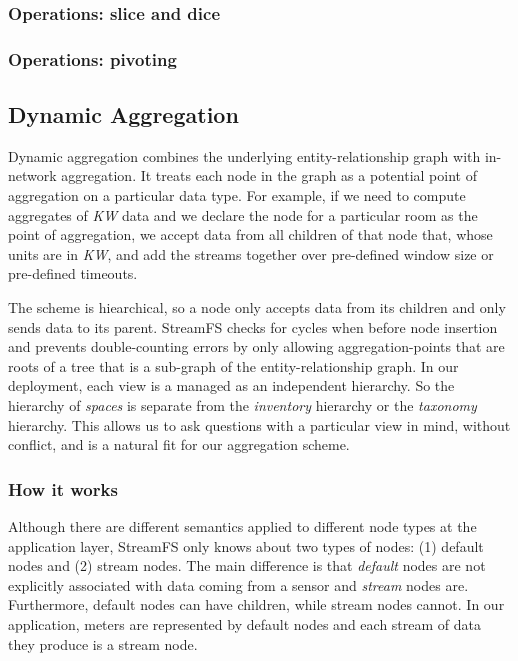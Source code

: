 \subsubsection{Operations: slice and dice}

\subsubsection{Operations: pivoting}
\subsection{Dynamic Aggregation}
\label{sec:dynagg}
Dynamic aggregation combines the underlying entity-relationship graph with in-network aggregation.  It treats
each node in the graph as a potential point of aggregation on a particular data type.  For example,
if we need to compute aggregates of \emph{KW} data and we declare the node for a particular room as
the point of aggregation, we accept data from all children of that node that, whose units are in \emph{KW},
and add the streams together over pre-defined window size or pre-defined timeouts.

The scheme is hiearchical, so a node only accepts data from its children and only sends data to its parent.
StreamFS checks for cycles when before node insertion and prevents double-counting errors by only allowing 
aggregation-points that are roots of a tree that is a sub-graph of the entity-relationship graph.  In our deployment,
each view is a managed as an independent hierarchy.  So the hierarchy of \emph{spaces} is separate from
the \emph{inventory} hierarchy or the \emph{taxonomy} hierarchy.  This allows us to ask questions with a particular
view in mind, without conflict, and is a natural fit for our aggregation scheme.

\subsubsection{How it works}
Although there are different semantics applied to different node types at the application layer, StreamFS only knows
about two types of nodes: (1) default nodes and (2) stream nodes.  The main difference is that \emph{default} nodes
are not explicitly associated with data coming from a sensor and \emph{stream} nodes are.  Furthermore, default
nodes can have children, while stream nodes cannot.  In our application, meters are represented by default nodes
and each stream of data they produce is a stream node.


